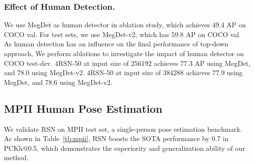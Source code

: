 \documentclass[runningheads]{llncs}
\begin{document}
\subsubsection{Effect of Human Detection.}\label{sec:human_det}
We use MegDet as human detector in ablation study, which achieves 49.4 AP on COCO val. For test sets, we use MegDet-v2, which has 59.8 AP on COCO val. As human detection has an influence on the final performance of top-down  approach, We perform ablations to investigate the impact of human detector on COCO test-dev.
4RSN-50 at input size of 256192 achieves 77.3 AP using MegDet, and  78.0 using MegDet-v2. 4RSN-50 at input size of 384288 achieves 77.9 using MegDet, and 78.6 using MegDet-v2.

\begin{table*}[h]
  \tiny
  \caption{Results on COCO test-challenge dataset. "*" means using ensembled models.}
  \centering
  \label{tb:test-challenge}
\end{table*}





\subsection{MPII Human Pose Estimation}\label{sec:mpii}
We validate RSN on MPII test set, a  single-person pose estimation benchmark. As shown in Table~\ref{tb:mpii}, RSN boosts the SOTA performance by 0.7 in PCKh@0.5, which demonstrates the superiority and generalization ability of our method.
\end{document}
